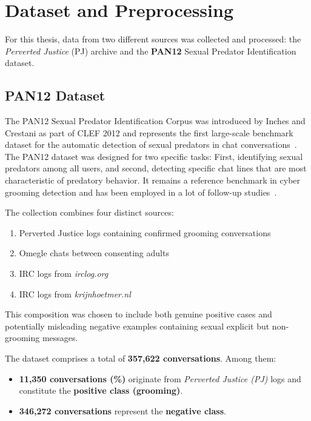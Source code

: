 \chapter{Dataset and Preprocessing}

For this thesis, data from two different sources was collected and processed: the \textit{Perverted Justice} (PJ) archive and the \textbf{PAN12} Sexual Predator Identification dataset.

\section{PAN12 Dataset}
The PAN12 Sexual Predator Identification Corpus was introduced by Inches and Crestani as part of CLEF 2012 and represents the first large-scale benchmark dataset for the automatic detection of sexual predators in chat conversations~\cite{inches2012pan}. The PAN12 dataset was designed for two specific tasks: First, identifying sexual predators among all users, and second, detecting specific chat lines that are most characteristic of predatory behavior. It remains a reference benchmark in cyber grooming detection and has been employed in a lot of follow-up studies~\cite{inches2012pan}.

The collection combines four distinct sources: 

\begin{enumerate}
    \item Perverted Justice logs containing confirmed grooming conversations
    \item Omegle chats between consenting adults
    \item IRC logs from \textit{irclog.org}
    \item IRC logs from \textit{krijnhoetmer.nl}
\end{enumerate}

 This composition was chosen to include both genuine positive cases and potentially misleading negative examples containing sexual explicit but non-grooming messages.  

The dataset comprises a total of \textbf{357{,}622 conversations}.  
Among them:  
\begin{itemize}
    \item \textbf{11{,}350 conversations (\%)} originate from \textit{Perverted Justice (PJ)} logs and constitute the \textbf{positive class (grooming)}.
    \item \textbf{346{,}272 conversations} represent the \textbf{negative class}.
\end{itemize}

